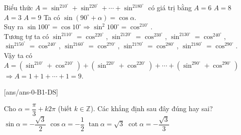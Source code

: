 	
								\begin{ex}%
									Biểu thức $A=\sin^210^\circ+\sin^220^\circ+\cdots +\sin^2180^\circ $ có giá trị bằng
									\choice
									{$A=6$}
									{$A=8$}
									{$A=3$}
									{\True $A=9$}
									\loigiai
									{	Ta có $\sin\left(90^\circ+\alpha\right)=\cos\alpha $.\\
										Suy ra $\sin 100^\circ=\cos 10^\circ\Rightarrow{\sin^2}100^\circ=\cos^210^\circ $.\\
										Tương tự ta có $\sin^2110^\circ=\cos^220^\circ $, $\sin^2120^\circ=\cos^230^\circ$, $\sin^2130^\circ=\cos^240^\circ $,\\
										$\sin^2150^\circ=\cos^240^\circ $, $\sin^2160^\circ=\cos^270^\circ $, $\sin^2170^\circ=\cos^280^\circ $, $\sin^2180^\circ=\cos^290^\circ $.\\
										Vậy ta có $A=\left(\sin^210^\circ+\cos^210^\circ\right)+\left(\sin^220^\circ+\cos^220^\circ\right)+ \cdots +\left(\sin^290^\circ+\cos^290^\circ\right)$		\\								$\Rightarrow A=1+1+\cdots +1=9$.}
								\end{ex}
								
		

\cauds
{}[ans/ans-0-B1-DS]



\begin{ex}%
Cho $\alpha=\dfrac{\pi}{3}+k2\pi $ (biết $k\in\mathbb{Z}$). Các khẳng định  sau đây đúng hay sai? 
\choiceTF
{$\sin\alpha=-\dfrac{\sqrt{3}}{2}$}
{$\cos\alpha=-\dfrac{1}{2}$}
{\True $\tan\alpha=\sqrt{3}$}
{$\cot\alpha=-\dfrac{\sqrt{3}}{3}$}
\end{ex}


